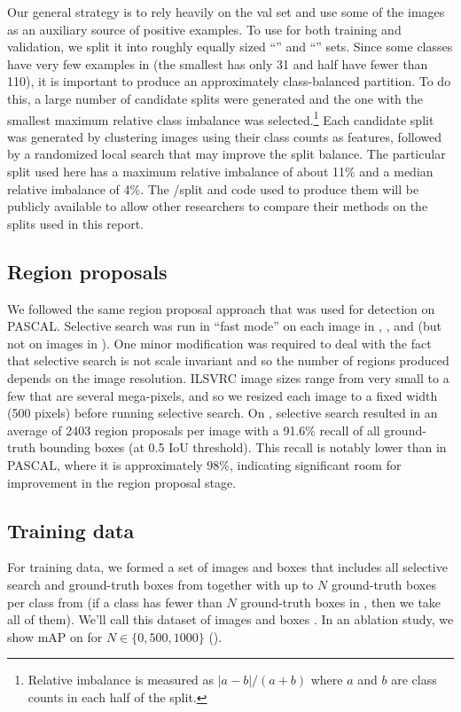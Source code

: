 Our general strategy is to rely heavily on the val set and use some of the \train images as an auxiliary source of positive examples.
To use \val for both training and validation, we split it into roughly equally sized ``\vala'' and ``\valb'' sets.
Since some classes have very few examples in \val (the smallest has only 31 and half have fewer than 110), it is important to produce an approximately class-balanced partition.
To do this, a large number of candidate splits were generated and the one with the smallest maximum relative class imbalance was selected.\footnote{Relative imbalance is measured as $|a - b| / (a+b)$ where $a$ and $b$ are class counts in each half of the split.}
Each candidate split was generated by clustering \val images using their class counts as features, followed by a randomized local search that may improve the split balance.
The particular split used here has a maximum relative imbalance of about 11\% and a median relative imbalance of 4\%.
The \vala/\valb split and code used to produce them will be publicly available to allow other researchers to compare their methods on the \val splits used in this report.

\subsection{Region proposals}
We followed the same region proposal approach that was used for detection on PASCAL.
Selective search \cite{UijlingsIJCV2013} was run in ``fast mode'' on each image in \vala, \valb, and \test (but not on images in \train).
One minor modification was required to deal with the fact that selective search is not scale invariant and so the number of regions produced depends on the image resolution.
ILSVRC image sizes range from very small to a few that are several mega-pixels, and so we resized each image to a fixed width (500 pixels) before running selective search.
On \val, selective search resulted in an average of 2403 region proposals per image with a 91.6\% recall of all ground-truth bounding boxes (at 0.5 IoU threshold).
This recall is notably lower than in PASCAL, where it is approximately 98\%, indicating significant room for improvement in the region proposal stage.

\subsection{Training data}
For training data, we formed a set of images and boxes that includes all selective search and ground-truth boxes from \vala together with up to $N$ ground-truth boxes per class from \train (if a class has fewer than $N$ ground-truth boxes in \train, then we take all of them).
We'll call this dataset of images and boxes \trainvalN.
In an ablation study, we show mAP on \valb for $N \in \{0, 500, 1000\}$ ().

